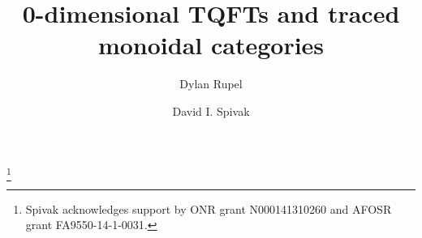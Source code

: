 \documentclass{amsart}
\theoremstyle{remark}
\theoremstyle{definition}
\begin{document}
\title{0-dimensional TQFTs and traced monoidal categories}

\author{Dylan Rupel}
\address{Northeastern University\\360 Huntington Ave.\\Boston, MA 02115}

\author{David I. Spivak}
\address{Massachusetts Institute of Technology\\77 Massachusetts Ave.\\Cambridge, MA 02139}

\thanks{Spivak acknowledges support by ONR grant N000141310260 and AFOSR grant FA9550-14-1-0031.}


\maketitle

\tableofcontents


\end{document}
